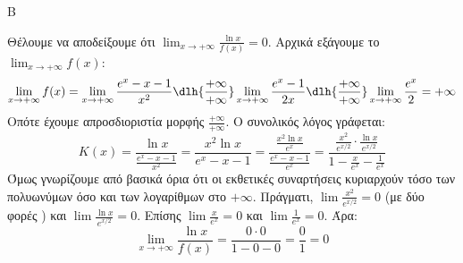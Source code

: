 \begin{thema}{Β}
\begin{erwthma}
\item Θέλουμε να αποδείξουμε ότι $\lim_{x\to+\infty} \frac{\ln x}{f(x)} = 0$.
Αρχικά εξάγουμε το $\lim_{x\to+\infty} f(x)$:
\[ \lim_{x\to+\infty} f(x) = \lim_{x\to+\infty} \frac{e^x - x - 1}{x^2} \dlh{\frac{+\infty}{+\infty}} \lim_{x\to+\infty} \frac{e^x - 1}{2x} \dlh{\frac{+\infty}{+\infty}} \lim_{x\to+\infty} \frac{e^x}{2} = +\infty \]
Οπότε έχουμε απροσδιοριστία μορφής $\frac{+\infty}{+\infty}$. 
Ο συνολικός λόγος γράφεται:
\[ K(x) = \frac{\ln x}{\frac{e^x-x-1}{x^2}} = \frac{x^2 \ln x}{e^x - x - 1} = \frac{\frac{x^2 \ln x}{e^x}}{\frac{e^x - x - 1}{e^x}} = \frac{\frac{x^2}{e^{x/2}} \cdot \frac{\ln x}{e^{x/2}}}{1 - \frac{x}{e^x} - \frac{1}{e^x}} \]
Όμως γνωρίζουμε από βασικά όρια ότι οι εκθετικές συναρτήσεις κυριαρχούν τόσο των πολυωνύμων όσο και των λογαρίθμων στο $+\infty$. 
Πράγματι, $\lim \frac{x^2}{e^{x/2}} = 0$ (με δύο φορές ) και $\lim \frac{\ln x}{e^{x/2}} = 0$. 
Επίσης $\lim \frac{x}{e^x} = 0$ και $\lim \frac{1}{e^x} = 0$. 
Άρα:
\[ \lim_{x\to+\infty} \frac{\ln x}{f(x)} = \frac{0 \cdot 0}{1 - 0 - 0} = \frac{0}{1} = 0 \]
\end{erwthma}
\end{thema}

